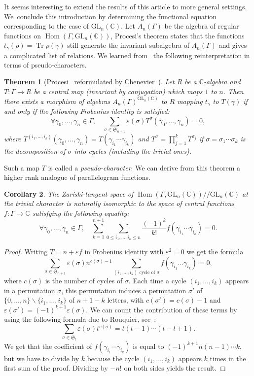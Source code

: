 \documentclass[JEP,XML,SOM,Unicode,NoEqCountersInSection]{cedram}
\let\epsilon\varepsilon
\newtheorem{theorem}{Theorem}[section]
\newtheorem{corollary}[theorem]{Corollary}
\theoremstyle{definition}
\newcommand{\CC}{\mathbb{C}}
\newcommand{\tr}{\operatorname{Tr}}
\newcommand{\GL}{\mathrm{GL}}
\newcommand{\Hom}{\operatorname{Hom}}
\begin{document}
It seems interesting to extend the results of this article to more general
settings. We~conclude this introduction by determining the functional
equation corresponding to the case of
$\GL_n(\CC)$.
Let $A_n(\Gamma)$ be the algebra of regular functions on
$\Hom(\Gamma,\GL_n(\CC))$, Procesi's theorem states that the functions
$t_\gamma(\rho)=\tr \rho(\gamma)$ still generate the invariant subalgebra
of $A_n(\Gamma)$ and gives a complicated list of relations.
We learned from~\cite[Chap.\,2]{ChenevierHab} the following reinterpretation
in terms of pseudo-characters.
\begin{theorem}[Procesi~\cite{Procesi} reformulated by
Chenevier~\cite{ChenevierHab}]
Let $R$ be a $\CC$-algebra and $T:\Gamma\to R$ be a central map
(\ie invariant by conjugation) which maps $1$ to $n$.
Then there exists a morphism of algebras
$A_n(\Gamma)^{\GL_n(\CC)}$ to $R$ mapping $t_\gamma$ to $T(\gamma)$
if and only if the following Frobenius identity is satisfied:
\[\forall \gamma_0,\ldots,\gamma_{n}\in \Gamma, \quad
\sum_{\sigma\in \mathfrak{S}_{n+1}}\epsilon(\sigma)T^\sigma
(\gamma_0,\ldots,\gamma_n)=0, \]
where
$T^{(i_1,\ldots,i_k)}(\gamma_0,\ldots,\gamma_n)=
T(\gamma_{i_1}\cdots\gamma_{i_k})$
and $T^{\sigma}=\prod_{j=1}^k T^{\sigma_j}$ if
$\sigma=\sigma_1\cdots\sigma_k$ is the decomposition of $\sigma$ into
cycles (including the trivial ones).
\end{theorem}
Such a map $T$ is called a {\em pseudo-character}. We can derive from this
theorem a higher rank analogue of parallelogram functions.
\begin{corollary}
The Zariski-tangent space of
$\Hom(\Gamma,\GL_n(\CC))/\!/\GL_n(\CC)$ at the trivial character is naturally isomorphic to the space
of central functions $f\colon\Gamma\to\CC$ satisfying the following equality:
\begin{equation}\label{eq:Paraln}
\forall \gamma_0,\ldots,\gamma_n\in \Gamma,
\quad\sum_{k=1}^{n+1}\sum_{0\le i_1,\ldots,
i_k\le n}\frac{(-1)^{k}}{k!}f(\gamma_{i_1}\cdots\gamma_{i_k})=0.
\end{equation}
\end{corollary}
\begin{proof}
Writing $T=n+\epsilon f$ in Frobenius identity with $\epsilon^2=0$ we get
the formula
\[ \sum_{\sigma\in \mathfrak{S}_{n+1}}\epsilon(\sigma)n^{c(\sigma)-1}
\sum_{(i_1,\ldots,i_k)\text{ cycle of }\sigma}f(\gamma_{i_1}\ldots
\gamma_{i_k})=0, \]
where $c(\sigma)$ is the number of cycles of $\sigma$.
Each time a cycle $(i_1,\ldots,i_k)$ appears in a permutation $\sigma$,
this permutation induces a permutation $\sigma'$ of
$\{0,\ldots,n\}\smallsetminus\{i_1,\ldots,i_k\}$ of $n+1-k$ letters,
with $c(\sigma')=c(\sigma)-1$ and
$\epsilon(\sigma')=(-1)^{k+1}\epsilon(\sigma)$.
We can count the contribution of these terms by using the following
formula due to Rouquier, see~\cite[Cor.\,3.2]{Rouquier}:
\[ \sum_{\sigma\in \mathfrak{S}_l}\epsilon(\sigma)t^{c(\sigma)}=t(t-1)
\cdots(t-l+1). \]
We get that the coefficient of $f(\gamma_{i_1}\cdots\gamma_{i_k})$ is
equal to $(-1)^{k+1}n(n-1)\cdots k$, but we have to divide by $k$ because
the cycle $(i_1,\ldots,i_k)$ appears $k$ times in the first sum of the
proof. Dividing by $-n!$ on both sides yields the result.
\end{proof}
\end{document}

